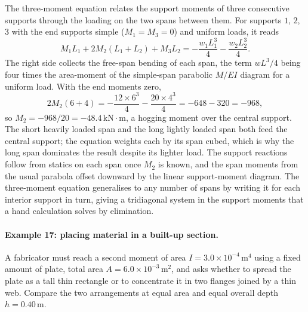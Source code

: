 The three-moment equation relates the support moments of three
consecutive supports through the loading on the two spans between them.
For supports $1$, $2$, $3$ with the end supports simple ($M_1 = M_3 = 0$)
and uniform loads, it reads
\[
M_1 L_1 + 2 M_2 (L_1 + L_2) + M_3 L_2
= -\frac{w_1 L_1^3}{4} - \frac{w_2 L_2^3}{4}.
\]
The right side collects the free-span bending of each span, the term
$w L^3/4$ being four times the area-moment of the simple-span parabolic
$M/EI$ diagram for a uniform load. With the end moments zero,
\[
2 M_2 (6 + 4) = -\frac{12 \times 6^3}{4} - \frac{20 \times 4^3}{4}
= -648 - 320 = -968,
\]
so $M_2 = -968/20 = -48.4\,\text{kN}\cdot\text{m}$, a hogging moment over
the central support. The short heavily loaded span and the long lightly
loaded span both feed the central support; the equation weights each by
its span cubed, which is why the long span dominates the result despite
its lighter load. The support reactions follow from statics on each span
once $M_2$ is known, and the span moments from the usual parabola offset
downward by the linear support-moment diagram. The three-moment equation
generalises to any number of spans by writing it for each interior
support in turn, giving a tridiagonal system in the support moments that
a hand calculation solves by elimination.

\paragraph{Example 17: placing material in a built-up section.} A
fabricator must reach a second moment of area $I = 3.0 \times 10^{-4}\,
\si{\meter\tothe{4}}$ using a fixed amount of plate, total area $A = 6.0
\times 10^{-3}\,\si{\meter\squared}$, and asks whether to spread the
plate as a tall thin rectangle or to concentrate it in two flanges joined
by a thin web. Compare the two arrangements at equal area and equal
overall depth $h = 0.40\,\si{\meter}$.

